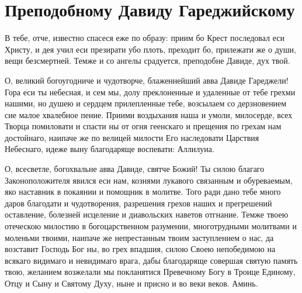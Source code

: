 \section{Преподобному Давиду Гареджийскому}\begin{mymulticols}





В тебе, отче, известно спасеся еже по образу: приим бо Крест последовал еси Христу, и дея учил еси презирати убо плоть, преходит бо, прилежати же о души, вещи безсмертней. Темже и со ангелы срадуется, преподобне Давиде, дух твой.




О, великий богоугодниче и чудотворче, блаженнейший авва Давиде Гареджели! Гора еси ты небесная, и сем мы, долу преклоненные и удаленные от тебе грехми нашими, но душею и сердцем прилепленные тебе, возсылаем со дерзновением сие малое хвалебное пение. Приими воздыхания наша и умоли, милосерде, всех Творца помиловати и спасти ны от огня геенскаго и прещения по грехам нам достойнаго, наипаче же по велицей милости Его наследовати Царствия Небеснаго, идеже выну благодаряще воспевати: Аллилуиа.




О, всесветле, богохвальне авва Давиде, святче Божий! Ты силою благаго Законоположителя явился еси нам, кознями лукавого связанным и обуреваемым, яко наставник в покаянии и помощник в молитве. Того ради дано тебе много даров благодати и чудотворения, разрешения грехов наших и прегрешений оставление, болезней исцеление и диавольских наветов отгнание. Темже твоею отеческою милостию в богоцарственном разумении, многотрудными молитвами и моленьми твоими, наипаче же непрестанным твоим заступлением о нас, да возставит Господь Бог ны, во грех впадшия, силою Своею непобедимою на всякаго видимаго и невидимаго врага, дабы благодаряще совершая святую память твою, желанием возжелали мы покланятися Превечному Богу в Троице Единому, Отцу и Сыну и Святому Духу, ныне и присно и во веки веков. Аминь.

\end{mymulticols}

\mychapterending





